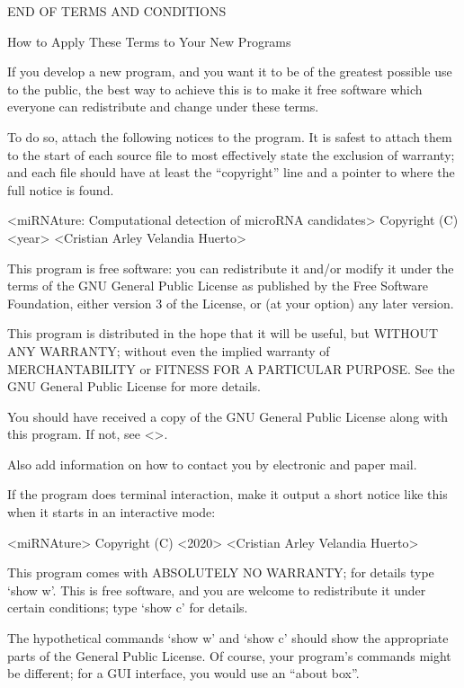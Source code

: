 \documentclass[letterpaper,10pt,english]{sphinxmanual}
\begin{document}
END OF TERMS AND CONDITIONS

How to Apply These Terms to Your New Programs

If you develop a new program, and you want it to be of the greatest possible use to the public, the best way to achieve this is to make it free software which everyone can redistribute and change under these terms.

To do so, attach the following notices to the program. It is safest to attach them to the start of each source file to most effectively state the exclusion of warranty; and each file should have at least the “copyright” line and a pointer to where the full notice is found.

\textless{}miRNAture: Computational detection of microRNA candidates\textgreater{}
Copyright (C) \textless{}year\textgreater{} \textless{}Cristian Arley Velandia Huerto\textgreater{}

This program is free software: you can redistribute it and/or modify it under the terms of the GNU General Public License as published by the Free Software Foundation, either version 3 of the License, or (at your option) any later version.

This program is distributed in the hope that it will be useful, but WITHOUT ANY WARRANTY; without even the implied warranty of MERCHANTABILITY or FITNESS FOR A PARTICULAR PURPOSE. See the GNU General Public License for more details.

You should have received a copy of the GNU General Public License along with this program. If not, see \textless{}\textgreater{}.

Also add information on how to contact you by electronic and paper mail.

If the program does terminal interaction, make it output a short notice like this when it starts in an interactive mode:

\textless{}miRNAture\textgreater{} Copyright (C) \textless{}2020\textgreater{} \textless{}Cristian Arley Velandia Huerto\textgreater{}

This program comes with ABSOLUTELY NO WARRANTY; for details type ‘show w’.
This is free software, and you are welcome to redistribute it under certain conditions; type ‘show c’ for details.

The hypothetical commands ‘show w’ and ‘show c’ should show the appropriate parts of the General Public License. Of course, your program’s commands might be different; for a GUI interface, you would use an “about box”.
\end{document}
